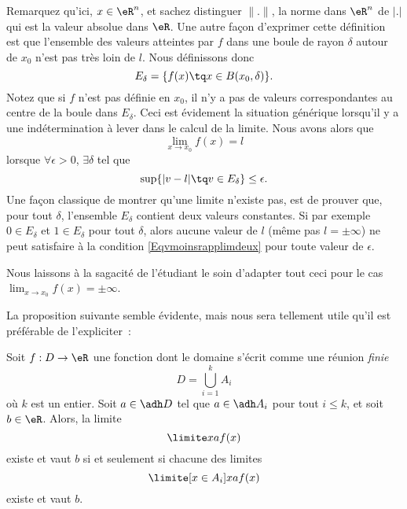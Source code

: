 Remarquez qu'ici, $x\in\eR^n$, et sachez distinguer $\| . \|$, la norme dans $\eR^n$ de $| . |$ qui est la valeur absolue dans $\eR$. Une autre façon d'exprimer cette définition est que l'ensemble des valeurs atteintes par $f$ dans une boule de rayon $\delta$ autour de $x_0$ n'est pas très loin de $l$. Nous définissons donc
\begin{equation}
	E_{\delta}=\{ f(x)\tq x\in B(x_0,\delta) \}.
\end{equation}
Notez que si $f$ n'est pas définie en $x_0$, il n'y a pas de valeurs correspondantes au centre de la boule dans $E_{\delta}$. Ceci est évidement la situation générique lorsqu'il y a une indétermination à lever dans le calcul de la limite. Nous avons alors que
\begin{equation}
	\lim_{x\to x_0}f(x)=l
\end{equation}
lorsque $\forall\epsilon>0$, $\exists\delta$ tel que 
\begin{equation}		\label{Eqvmoinsrapplimdeux}
	\sup\{ | v-l |\tq v\in E_{\delta} \}\leq\epsilon.
\end{equation}
Une façon classique de montrer qu'une limite n'existe pas, est de prouver que, pour tout $\delta$, l'ensemble $E_{\delta}$ contient deux valeurs constantes. Si par exemple $0\in E_{\delta}$ et $1\in E_{\delta}$ pour tout $\delta$, alors aucune valeur de $l$ (même pas $l=\pm\infty$) ne peut satisfaire à la condition \eqref{Eqvmoinsrapplimdeux} pour toute valeur de $\epsilon$.

Nous laissons à la sagacité de l'étudiant le soin d'adapter tout ceci pour le cas $\lim_{x\to x_0}f(x)=\pm\infty$.

La proposition suivante semble évidente, mais nous sera tellement
utile qu'il est préférable de l'expliciter~:
\begin{proposition}
Soit $f : D \to \eR$ une fonction dont le domaine
  s'écrit comme une réunion \emph{finie}
  \begin{equation*}
    D = \bigcup_{i=1}^k A_i
  \end{equation*}  
  où $k$ est un entier. Soit $a \in \adh D$ tel que $a \in \adh A_i$
  pour tout $i \leq k$, et soit $b \in \eR$. Alors, la limite
  \begin{equation*}
    \limite x a f(x)
  \end{equation*}
  existe et vaut $b$ si et seulement si chacune des limites
  \begin{equation*}
    \limite[x \in A_i] x a f(x)
  \end{equation*}
  existe et vaut $b$.
\end{proposition}

